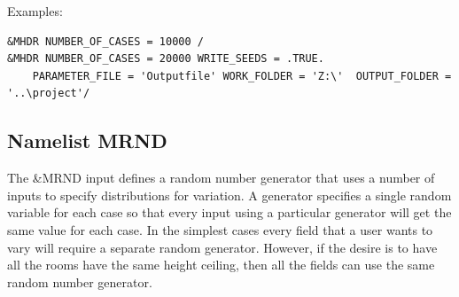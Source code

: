 \documentclass[12pt,twoside]{book}
\begin{document}
\vspace{\baselineskip}
\noindent Examples:
\begin{lstlisting}
&MHDR NUMBER_OF_CASES = 10000 /
&MHDR NUMBER_OF_CASES = 20000 WRITE_SEEDS = .TRUE.
	PARAMETER_FILE = 'Outputfile' WORK_FOLDER = 'Z:\'  OUTPUT_FOLDER = '..\project'/
\end{lstlisting}



\subsection{Namelist MRND}
\label{info:MRND}

The {\ct \&MRND} input defines a random number generator that uses a number of inputs to specify distributions for variation. A generator specifies a single random variable for each case so that every input using a particular generator will get the same value for each case. In the simplest cases every field that a user wants to vary will require a separate random generator. However, if the desire is to have all the rooms have the same height ceiling, then all the fields can use the same random number generator. 
\end{document}
